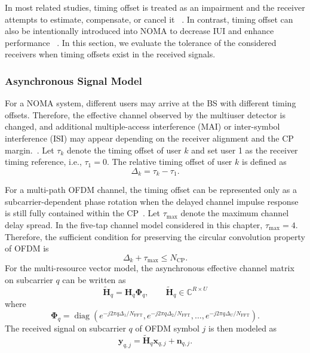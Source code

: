 In most related studies, timing offset is treated as an impairment and the receiver attempts to estimate, compensate, or cancel it ~\cite{lin2023uplink,haci2017performance,minn2003robust}. In contrast, timing offset can also be intentionally introduced into NOMA to decrease IUI and enhance performance ~\cite{li2023transceiver}. In this section, we evaluate the tolerance of the considered receivers when timing offsets exist in the received signals.

\subsubsection{Asynchronous Signal Model}

For a NOMA system, different users may arrive at the BS with different timing offsets. Therefore, the effective channel observed by the multiuser detector is changed, and additional  multiple-access interference (MAI) or inter-symbol interference  (ISI) may appear depending on the receiver alignment and the CP margin.~\cite{lin2023uplink}. 
Let $\tau_k$ denote the timing offset of user $k$ and set user 1 as the receiver timing reference, i.e., $\tau_1=0$. The relative timing offset of user $k$ is defined as
\begin{equation}
    \Delta_k
    =
    \tau_k-\tau_1 .
    \label{eq:async-relative-delay}
\end{equation}

For a multi-path OFDM channel, the timing offset can be represented only as a subcarrier-dependent phase rotation when the delayed channel impulse response is still fully contained within the CP~\cite{minn2003robust}. Let $\tau_{\max}$ denote the maximum channel delay spread. In the five-tap channel model considered in this chapter, $\tau_{\max}=4$. Therefore, the sufficient condition for preserving the circular convolution property of OFDM is
\begin{equation}
    \Delta_k+\tau_{\max}
    \leq
    N_{\mathrm{CP}} .
    \label{eq:async-cp-condition}
\end{equation}
For the multi-resource vector model, the asynchronous effective channel matrix on subcarrier $q$ can be written as
\begin{equation}
    \tilde{\bm{H}}_q
    =
    \bm{H}_q
    \bm{\Phi}_{q},
    \qquad
    \bm{\tilde{H}}_{q} \in\mathbb{C}^{R\times U}
    \label{eq:async-effective-channel-matrix}
\end{equation}
where
\begin{equation}
    \bm{\Phi}_{q}
    =
    \operatorname{diag}
    \left(
    e^{-j2\pi q\Delta_1/N_{\mathrm{FFT}}},
    e^{-j2\pi q\Delta_2/N_{\mathrm{FFT}}},
    \ldots,
    e^{-j2\pi q\Delta_U/N_{\mathrm{FFT}}}
    \right).
    \label{eq:async-phase-matrix}
\end{equation}
The received signal on subcarrier $q$ of OFDM symbol $j$ is then modeled as
\begin{equation}
    \bm{y}_{q,j}
    =
    \tilde{\bm{H}}_q\bm{x}_{q,j}
    +
    \bm{n}_{q,j}.
    \label{eq:async-ofdm-received}
\end{equation}

